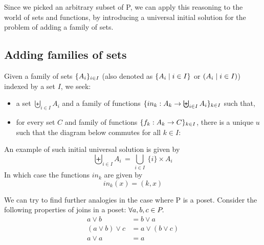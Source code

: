 \begin{center}
\end{center}

Since we picked an arbitrary subset of P, we can apply this reasoning to
the world of sets and functions, by introducing a universal initial solution
for the problem of adding a family of sets.

\subsection{Adding families of sets}

Given a family of sets $\{ A_i \}_{i\in I}$ \big(also denoted as
$\{  A_i \mid i \in I  \}$ or $(A_i\mid i\in I)$\big) indexed by a
set $I$, we seek:
\begin{itemize}
\item
  a set $\biguplus_{i \in I} A_i$ and a family of functions
  $\{  in_k: A_k\to \biguplus_{i \in I} A_i  \}_{k\in I}$ such that,
\item
  for every set $C$ and family of functions
  $\{  f_k: A_k\to C  \}_{k\in I}$, there is a unique $u$ such that the
  diagram below commutes for all $k\in I$:
\begin{center}
\end{center}
\end{itemize}

An example of such initial universal solution is given by
\[ \biguplus_{i \in I} A_i \,=\, \bigcup_{i \in I}\ \{i\} \times A_i \]
In which case the functions $in_k$ are given by
\[ in_k(x) = (k, x)\]

We can try to find further analogies in the case where P is a poset. Consider
the following properties of joins in a poset: $\forall a, b, c \in P \ldotp$
\begin{align*}
    a \vee b &= b \vee a \\
    (a \vee b) \vee c &= a \vee (b \vee c) \\
    a \vee a &= a \\
\end{align*}

